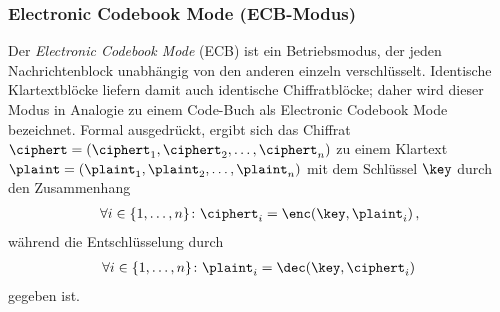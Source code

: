 \subsubsection{Electronic Codebook Mode (ECB-Modus)}
Der \emph{Electronic Codebook Mode} (ECB) ist ein Betriebsmodus, der jeden Nachrichtenblock unabhängig von den anderen einzeln verschlüsselt. Identische Klartextblöcke liefern damit auch identische Chiffratblöcke; daher wird dieser Modus in Analogie zu einem
Code-Buch als Electronic Codebook Mode bezeichnet. Formal ausgedrückt, ergibt sich das Chiffrat $\ciphert =  (\ciphert_{1},\ciphert_{2},\dots,\ciphert_{n})$ zu einem Klartext $\plaint = (\plaint_{1},\plaint_{2},\dots,\plaint_{n})$ mit dem Schlüssel $\key$ durch den Zusammenhang
\begin{align*}
	\forall i \in \{1,\dots,n\}\colon \ciphert_{i} = \enc(\key,\plaint_{i})\, ,
\end{align*}
während die Entschlüsselung durch
\begin{align*}
	\forall i \in \{1,\dots,n\}\colon \plaint_{i} = \dec(\key,\ciphert_{i})\, 
\end{align*}
gegeben ist.

